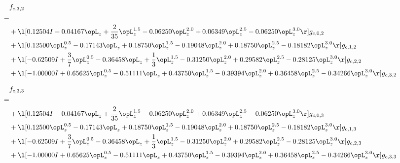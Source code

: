 \begin{alignat}{2} 
\label{eq:f_32_0} 
& f_{c,3,2} \nonumber \\ 
 = \\ 
& + \l[  0.12504 I   -0.04167 \opL_z + \frac{2}{35} \opL_z^{1.5}   -0.06250 \opL_z^{2.0} +  0.06349 \opL_z^{2.5}   -0.06250 \opL_z^{3.0}  \r] g_{c,0,2} \nonumber \\ 
& + \l[  0.12500 \opL_z^{0.5}   -0.17143 \opL_z +  0.18750 \opL_z^{1.5}   -0.19048 \opL_z^{2.0} +  0.18750 \opL_z^{2.5}   -0.18182 \opL_z^{3.0}  \r] g_{c,1,2} \nonumber \\ 
& + \l[  -0.62509 I + \frac{3}{7} \opL_z^{0.5}   -0.36458 \opL_z + \frac{1}{3} \opL_z^{1.5}   -0.31250 \opL_z^{2.0} +  0.29582 \opL_z^{2.5}   -0.28125 \opL_z^{3.0}  \r] g_{c,2,2} \nonumber \\ 
& + \l[  -1.00000 I +  0.65625 \opL_z^{0.5}   -0.51111 \opL_z +  0.43750 \opL_z^{1.5}   -0.39394 \opL_z^{2.0} +  0.36458 \opL_z^{2.5}   -0.34266 \opL_z^{3.0}  \r] g_{c,3,2} \nonumber \\ 
\end{alignat} 


\begin{alignat}{2} 
\label{eq:f_33_0} 
& f_{c,3,3} \nonumber \\ 
 = \\ 
& + \l[  0.12504 I   -0.04167 \opL_z + \frac{2}{35} \opL_z^{1.5}   -0.06250 \opL_z^{2.0} +  0.06349 \opL_z^{2.5}   -0.06250 \opL_z^{3.0}  \r] g_{c,0,3} \nonumber \\ 
& + \l[  0.12500 \opL_z^{0.5}   -0.17143 \opL_z +  0.18750 \opL_z^{1.5}   -0.19048 \opL_z^{2.0} +  0.18750 \opL_z^{2.5}   -0.18182 \opL_z^{3.0}  \r] g_{c,1,3} \nonumber \\ 
& + \l[  -0.62509 I + \frac{3}{7} \opL_z^{0.5}   -0.36458 \opL_z + \frac{1}{3} \opL_z^{1.5}   -0.31250 \opL_z^{2.0} +  0.29582 \opL_z^{2.5}   -0.28125 \opL_z^{3.0}  \r] g_{c,2,3} \nonumber \\ 
& + \l[  -1.00000 I +  0.65625 \opL_z^{0.5}   -0.51111 \opL_z +  0.43750 \opL_z^{1.5}   -0.39394 \opL_z^{2.0} +  0.36458 \opL_z^{2.5}   -0.34266 \opL_z^{3.0}  \r] g_{c,3,3} \nonumber \\ 
\end{alignat} 


